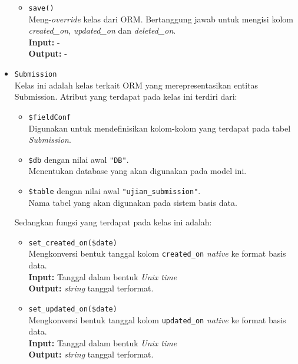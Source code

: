 \begin{itemize}
\begin{itemize}
                \item \texttt{save()}\\
                    Meng-\textit{override} kelas dari ORM. Bertanggung jawab untuk mengisi
                    kolom \textit{created\_on}, \textit{updated\_on} dan \textit{deleted\_on}.\\
                    \textbf{Input:} -\\
                    \textbf{Output:} -
            \end{itemize}
            
        \item \texttt{Submission} \\
            Kelas ini adalah kelas terkait ORM yang merepresentasikan entitas Submission. Atribut yang 
            terdapat pada kelas ini terdiri dari:
            \begin{itemize}
                \item \texttt{\$fieldConf} \\
                    Digunakan untuk mendefinisikan kolom-kolom yang terdapat pada tabel \textit{Submission}.
                \item \texttt{\$db} dengan nilai awal \texttt{"DB"}. \\
                    Menentukan database yang akan digunakan pada model ini.
                \item \texttt{\$table} dengan nilai awal \texttt{"ujian\_submission"}. \\
                    Nama tabel yang akan digunakan pada sistem basis data. 
            \end{itemize}
            Sedangkan fungsi yang terdapat pada kelas ini adalah:
            \begin{itemize}
                \item \texttt{set\_created\_on(\$date)} \\
                    Mengkonversi bentuk tanggal kolom \texttt{created\_on} \textit{native} ke 
                    format basis data. \\
                    \textbf{Input:} Tanggal dalam bentuk \textit{Unix time}\\
                    \textbf{Output:} \textit{string} tanggal terformat.
                
                \item \texttt{set\_updated\_on(\$date)} \\
                    Mengkonversi bentuk tanggal kolom \texttt{updated\_on} \textit{native} ke 
                    format basis data. \\
                    \textbf{Input:} Tanggal dalam bentuk \textit{Unix time}\\
                    \textbf{Output:} \textit{string} tanggal terformat.
                    

\end{itemize}
\end{itemize}

